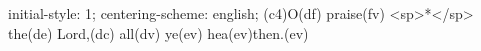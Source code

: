 initial-style: 1;
centering-scheme: english;
(c4)O(df) praise(fv) <sp>*</sp> the(de) Lord,(dc) all(dv) ye(ev) hea(ev)then.(ev)
